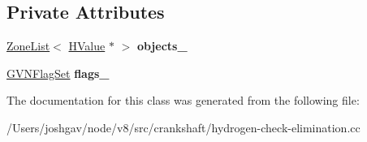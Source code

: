 \subsection*{Private Attributes}
\begin{DoxyCompactItemize}
\item 
\hyperlink{classv8_1_1internal_1_1_zone_list}{Zone\+List}$<$ \hyperlink{classv8_1_1internal_1_1_h_value}{H\+Value} $\ast$ $>$ {\bfseries objects\+\_\+}\hypertarget{classv8_1_1internal_1_1_h_check_maps_effects_ab4bc00f49f4e3ee9203ce4ce81483917}{}\label{classv8_1_1internal_1_1_h_check_maps_effects_ab4bc00f49f4e3ee9203ce4ce81483917}

\item 
\hyperlink{classv8_1_1internal_1_1_enum_set}{G\+V\+N\+Flag\+Set} {\bfseries flags\+\_\+}\hypertarget{classv8_1_1internal_1_1_h_check_maps_effects_a048dcf20512c4233d5b7fcba6044e526}{}\label{classv8_1_1internal_1_1_h_check_maps_effects_a048dcf20512c4233d5b7fcba6044e526}

\end{DoxyCompactItemize}


The documentation for this class was generated from the following file\+:\begin{DoxyCompactItemize}
\item 
/\+Users/joshgav/node/v8/src/crankshaft/hydrogen-\/check-\/elimination.\+cc\end{DoxyCompactItemize}
